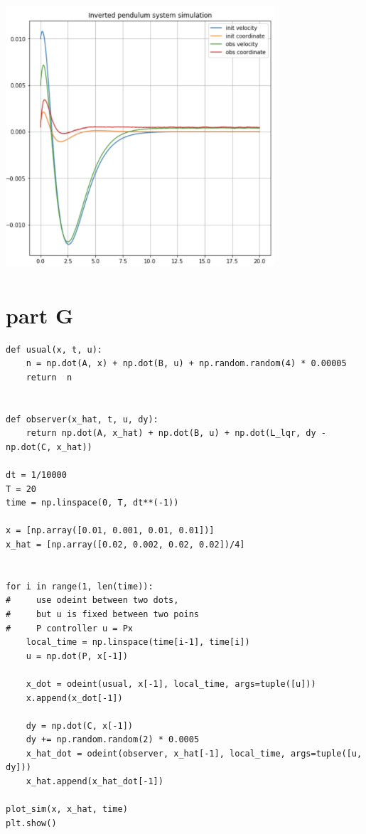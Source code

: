\documentclass[a4paper,11pt]{article}
\makeatletter
\newcommand{\problemquestion}[1]{\gdef\@problemquestion{#1}}%
\theoremstyle{mytheor}
\makeatother
\begin{document}
\includegraphics[width=10cm, height=10cm]{F.png}



\section*{part G}
\begin{problem}
  \problemquestion{Add white gaussian noise to the dynamics ($\delta \dot{z} = A\delta z + B\delta u + w$). What happens to the state estimation and control system?}
\end{problem}

\begin{lstlisting}
def usual(x, t, u):
    n = np.dot(A, x) + np.dot(B, u) + np.random.random(4) * 0.00005
    return  n


def observer(x_hat, t, u, dy):
    return np.dot(A, x_hat) + np.dot(B, u) + np.dot(L_lqr, dy - np.dot(C, x_hat))

dt = 1/10000
T = 20
time = np.linspace(0, T, dt**(-1))

x = [np.array([0.01, 0.001, 0.01, 0.01])]
x_hat = [np.array([0.02, 0.002, 0.02, 0.02])/4]


for i in range(1, len(time)):
#     use odeint between two dots,
#     but u is fixed between two poins
#     P controller u = Px
    local_time = np.linspace(time[i-1], time[i])
    u = np.dot(P, x[-1])

    x_dot = odeint(usual, x[-1], local_time, args=tuple([u]))
    x.append(x_dot[-1])
    
    dy = np.dot(C, x[-1]) 
    dy += np.random.random(2) * 0.0005
    x_hat_dot = odeint(observer, x_hat[-1], local_time, args=tuple([u, dy]))
    x_hat.append(x_hat_dot[-1])
    
plot_sim(x, x_hat, time)
plt.show()

\end{lstlisting}
\end{document}
